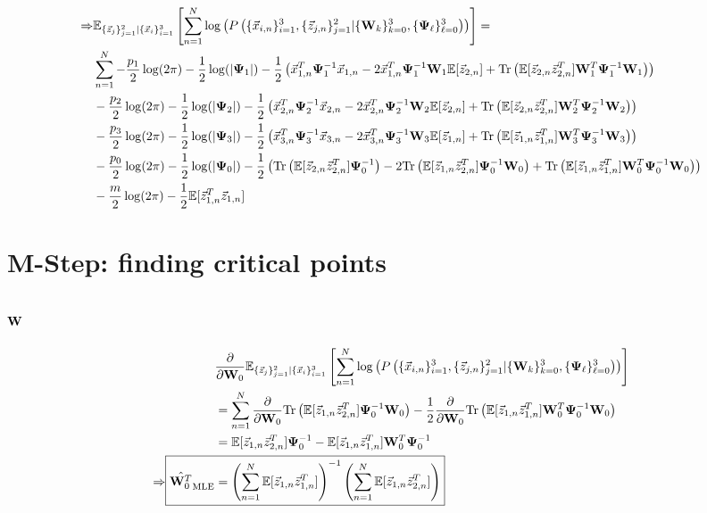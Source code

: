 \begin{landscape}
\newcommand{\ecll}{\ev_{\{ \z_j\}_{j=1}^2 | \{\x_i\}_{i=1}^3}
  \left[ \sum_{n=1}^N \log \left( \fulljointp \right) \right] }
\begin{equation}
\begin{split}
\Rightarrow & \ecll= \\
& \sum_{n=1}^N - \frac{p_1}{2} \log (2\pi) - \frac{1}{2} \log( |\bpsi_1| ) -
\frac{1}{2} \left(
  \x_{1,n}^T \bpsi_1^{-1} \x_{1,n} - 2 \x_{1,n}^T    \bpsi_1^{-1} \W_1 \ev[ \z_{2,n}] +
  \Tr \left( \ev[\z_{2,n} \z_{2,n}^T ] \W_1^T  \bpsi_1^{-1}
    \W_1\right) \right)\\
& - \frac{p_2}{2} \log (2\pi) - \frac{1}{2} \log( |\bpsi_2| ) -
\frac{1}{2} \left(
\x_{2,n}^T \bpsi_2^{-1} \x_{2,n} - 2 \x_{2,n}^T    \bpsi_2^{-1} \W_2 \ev[\z_{2,n}] +
  \Tr \left( \ev[\z_{2,n} \z_{2,n}^T ] \W_2^T  \bpsi_2^{-1}
    \W_2\right) \right)\\
& - \frac{p_3}{2} \log (2\pi) - \frac{1}{2} \log( |\bpsi_3| ) -
\frac{1}{2} \left(
\x_{3,n}^T \bpsi_3^{-1} \x_{3,n} - 2 \x_{3,n}^T    \bpsi_3^{-1} \W_3 \ev[\z_{1,n} ]+
  \Tr \left( \ev[\z_{1,n} \z_{1,n}^T ] \W_3^T  \bpsi_3^{-1}
    \W_3\right) \right)\\
& - \frac{p_0}{2} \log (2\pi) - \frac{1}{2} \log( |\bpsi_0| ) -
\frac{1}{2} \left(
\Tr \left( \ev [\z_{2,n} \z_{2,n}^T] \bpsi_0^{-1} \right)  - 2 \Tr \left( \ev[\z_{1,n}\z_{2,n}^T]
  \bpsi_0^{-1} \W_0 \right) +
  \Tr \left( \ev[\z_{1,n} \z_{1,n}^T ] \W_0^T  \bpsi_0^{-1}
    \W_0\right) \right)\\
& -\frac{m}{2} \log( 2 \pi) - \frac{1}{2} \ev [ \z_{1,n}^T \z_{1,n}]
\end{split}
\end{equation}
\end{landscape}
\pagebreak
\section{M-Step: finding critical points}
\subsection{$\bold{W}$}

\begin{align*}
  &\frac{  \partial }{\partial \W_0} \ecll \\
  &=  \sum_{n=1}^N \frac{\partial}{\partial \W_0} \Tr \left(\ev [\z_{1,n} \z_{2,n}^T]
      \bpsi_0^{-1} \W_0 \right) - \frac{1}{2} \frac{\partial}{\partial
      \W_0 }\Tr \left( \ev [ \z_{1,n}
    \z_{1,n}^T] \W_0^T \bpsi_0^{-1} \W_0 \right) \\
  &=  \ev [\z_{1,n} \z_{2,n}^T] \bpsi_0^{-1} - \ev [\z_{1,n} \z_{1,n}^T] \W_0^T
    \bpsi_0^{-1}\\
   \Rightarrow \Aboxed{ \hat{\W_0^T}_{\text{MLE}} &= \left(
                                                    \sum_{n=1}^N \ev [\z_{1,n} \z_{1,n}^T]
      \right)^{-1} \left( \sum_{n=1}^N \ev [\z_{1,n} \z_{2,n}^T] \right)}\\
\end{align*}

